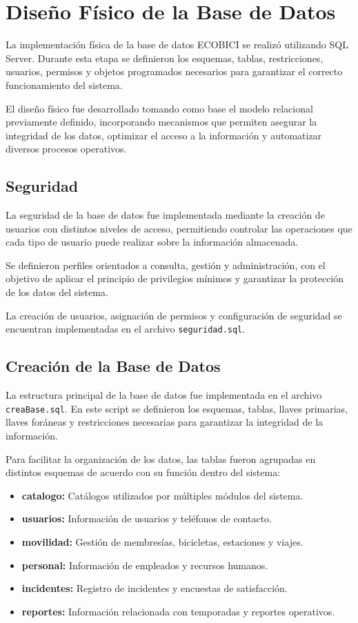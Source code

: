 \section{Diseño Físico de la Base de Datos}

La implementación física de la base de datos ECOBICI se realizó utilizando SQL Server. Durante esta etapa se definieron los esquemas, tablas, restricciones, usuarios, permisos y objetos programados necesarios para garantizar el correcto funcionamiento del sistema.

El diseño físico fue desarrollado tomando como base el modelo relacional previamente definido, incorporando mecanismos que permiten asegurar la integridad de los datos, optimizar el acceso a la información y automatizar diversos procesos operativos.

\subsection{Seguridad}

La seguridad de la base de datos fue implementada mediante la creación de usuarios con distintos niveles de acceso, permitiendo controlar las operaciones que cada tipo de usuario puede realizar sobre la información almacenada.

Se definieron perfiles orientados a consulta, gestión y administración, con el objetivo de aplicar el principio de privilegios mínimos y garantizar la protección de los datos del sistema.

La creación de usuarios, asignación de permisos y configuración de seguridad se encuentran implementadas en el archivo \texttt{seguridad.sql}.

\subsection{Creación de la Base de Datos}

La estructura principal de la base de datos fue implementada en el archivo \texttt{creaBase.sql}. En este script se definieron los esquemas, tablas, llaves primarias, llaves foráneas y restricciones necesarias para garantizar la integridad de la información.

Para facilitar la organización de los datos, las tablas fueron agrupadas en distintos esquemas de acuerdo con su función dentro del sistema:
\begin{itemize}
	\item \textbf{catalogo:} Catálogos utilizados por múltiples módulos del sistema.
	\item \textbf{usuarios:} Información de usuarios y teléfonos de contacto.
	\item \textbf{movilidad:} Gestión de membresías, bicicletas, estaciones y viajes.
	\item \textbf{personal:} Información de empleados y recursos humanos.
	\item \textbf{incidentes:} Registro de incidentes y encuestas de satisfacción.
	\item \textbf{reportes:} Información relacionada con temporadas y reportes operativos.
\end{itemize}

